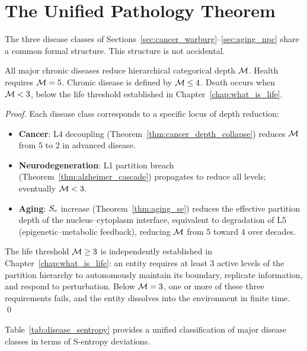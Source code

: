 \section{The Unified Pathology Theorem}
\label{sec:unified_pathology}

The three disease classes of Sections~\ref{sec:cancer_warburg}--\ref{sec:aging_npc}
share a common formal structure. This structure is not accidental.

\begin{theorem}
\label{thm:unified_pathology}
All major chronic diseases reduce hierarchical categorical depth $\mathcal{M}$.
Health requires $\mathcal{M} = 5$. Chronic disease is defined by $\mathcal{M} \leq 4$.
Death occurs when $\mathcal{M} < 3$, below the life threshold established in
Chapter~\ref{chap:what_is_life}.
\end{theorem}

\begin{proof}
Each disease class corresponds to a specific locus of depth reduction:
\begin{itemize}
  \item \textbf{Cancer}: L4 decoupling (Theorem~\ref{thm:cancer_depth_collapse})
        reduces $\mathcal{M}$ from 5 to 2 in advanced disease.
  \item \textbf{Neurodegeneration}: L1 partition breach (Theorem~\ref{thm:alzheimer_cascade})
        propagates to reduce all levels; eventually $\mathcal{M} < 3$.
  \item \textbf{Aging}: $S_e$ increase (Theorem~\ref{thm:aging_se}) reduces
        the effective partition depth of the nucleus--cytoplasm interface,
        equivalent to degradation of L5 (epigenetic--metabolic feedback),
        reducing $\mathcal{M}$ from 5 toward 4 over decades.
\end{itemize}

The life threshold $\mathcal{M} \geq 3$ is independently established in
Chapter~\ref{chap:what_is_life}: an entity requires at least 3 active levels
of the partition hierarchy to autonomously maintain its boundary, replicate
information, and respond to perturbation. Below $\mathcal{M} = 3$, one or more
of these three requirements fails, and the entity dissolves into the
environment in finite time. \qed
\end{proof}

Table~\ref{tab:disease_sentropy} provides a unified classification of major
disease classes in terms of S-entropy deviations.

